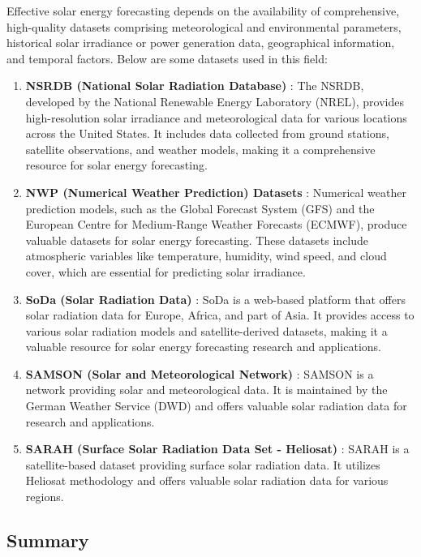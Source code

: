 \documentclass[12pt]{uomthesis}
\begin{document}
Effective solar energy forecasting depends on the availability of comprehensive, high-quality datasets comprising meteorological and environmental parameters, historical solar irradiance or power generation data, geographical information, and temporal factors. Below are some datasets used in this field:

\begin{enumerate}
    \item \textbf{NSRDB (National Solar Radiation Database)} \cite{NSRDB}: The NSRDB, developed by the National Renewable Energy Laboratory (NREL), provides high-resolution solar irradiance and meteorological data for various locations across the United States. It includes data collected from ground stations, satellite observations, and weather models, making it a comprehensive resource for solar energy forecasting.
    
    \item \textbf{NWP (Numerical Weather Prediction) Datasets} \cite{ECMWF,GFS}: Numerical weather prediction models, such as the Global Forecast System (GFS) and the European Centre for Medium-Range Weather Forecasts (ECMWF), produce valuable datasets for solar energy forecasting. These datasets include atmospheric variables like temperature, humidity, wind speed, and cloud cover, which are essential for predicting solar irradiance.
    
    \item \textbf{SoDa (Solar Radiation Data)} \cite{SoDa}: SoDa is a web-based platform that offers solar radiation data for Europe, Africa, and part of Asia. It provides access to various solar radiation models and satellite-derived datasets, making it a valuable resource for solar energy forecasting research and applications.
    
    \item \textbf{SAMSON (Solar and Meteorological Network)} \cite{SAMSON}: SAMSON is a network providing solar and meteorological data. It is maintained by the German Weather Service (DWD) and offers valuable solar radiation data for research and applications.
    
    \item \textbf{SARAH (Surface Solar Radiation Data Set - Heliosat)} \cite{SARAH}: SARAH is a satellite-based dataset providing surface solar radiation data. It utilizes Heliosat methodology and offers valuable solar radiation data for various regions.
\end{enumerate}

\subsection{Summary}
\end{document}
